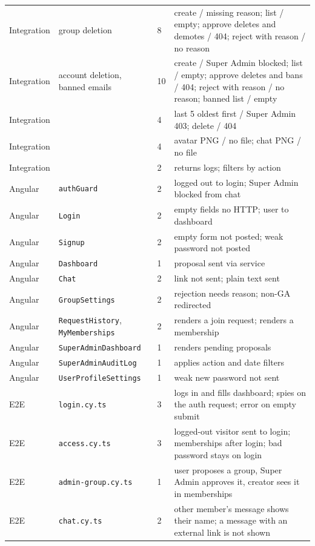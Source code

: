 \documentclass[10pt,a4paper]{article}
\newcommand{\ep}[1]{\texttt{\small #1}}
\begin{document}
\begin{longtable}{L{1.8cm} L{4.2cm} L{0.5cm} L{8.8cm}}
Integration & group deletion & 8 & create / missing reason; list / empty; approve deletes and demotes / 404; reject with reason / no reason\\
Integration & account deletion, banned emails & 10 & create / Super Admin blocked; list / empty; approve deletes and bans / 404; reject with reason / no reason; banned list / empty\\
Integration &  & 4 & last 5 oldest first / Super Admin 403; delete / 404\\
Integration &  & 4 & avatar PNG / no file; chat PNG / no file\\
Integration &  & 2 & returns logs; filters by action\\
\midrule
Angular & \ep{authGuard} & 2 & logged out to login; Super Admin blocked from chat\\
Angular & \ep{Login} & 2 & empty fields no HTTP; user to dashboard\\
Angular & \ep{Signup} & 2 & empty form not posted; weak password not posted\\
Angular & \ep{Dashboard} & 1 & proposal sent via service\\
Angular & \ep{Chat} & 2 & link not sent; plain text sent\\
Angular & \ep{GroupSettings} & 2 & rejection needs reason; non-GA redirected\\
Angular & \ep{RequestHistory}, \ep{MyMemberships} & 2 & renders a join request; renders a membership\\
Angular & \ep{SuperAdminDashboard} & 1 & renders pending proposals\\
Angular & \ep{SuperAdminAuditLog} & 1 & applies action and date filters\\
Angular & \ep{UserProfileSettings} & 1 & weak new password not sent\\
\midrule
E2E & \ep{login.cy.ts} & 3 & logs in and fills dashboard; spies on the auth request; error on empty submit\\
E2E & \ep{access.cy.ts} & 3 & logged-out visitor sent to login; memberships after login; bad password stays on login\\
E2E & \ep{admin-group.cy.ts} & 1 & user proposes a group, Super Admin approves it, creator sees it in memberships\\
E2E & \ep{chat.cy.ts} & 2 & other member's message shows their name; a message with an external link is not shown\\
\bottomrule
\end{longtable}
\normalsize
\end{document}
